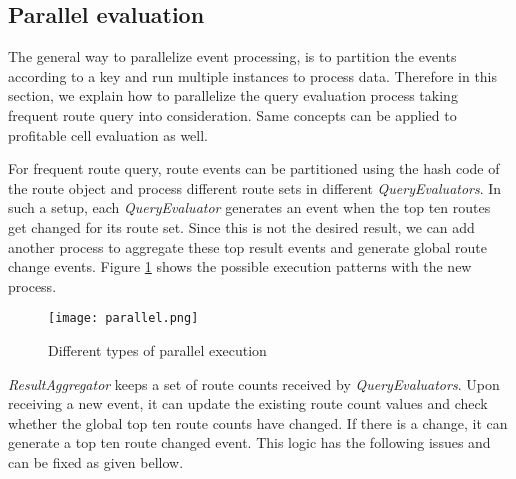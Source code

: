 \subsection{Parallel evaluation}
The general way to parallelize event processing, is to partition the events according to a key and run multiple instances to process data. Therefore in this section, we explain how to parallelize the query evaluation process taking frequent route query into consideration. Same concepts can be applied to profitable cell evaluation as well.

For frequent route query, route events can be partitioned using the hash code of the route object and process different route sets in different \textit{QueryEvaluators}. In such a setup, each \textit{QueryEvaluator} generates an event when the top ten routes get changed for its route set. Since this is not the desired result, we can add another process to aggregate these top result events and generate global route change events. Figure \ref{parallel} shows the possible execution patterns with the new process.

\begin{figure}[!t]
        \centering
        \texttt{[image: parallel.png]}
        \caption{Different types of parallel execution}
        \label{parallel}
\end{figure}

\textit{ResultAggregator} keeps a set of route counts received by \textit{QueryEvaluators}. Upon receiving a new event, it can update the existing route count values and check whether the global top ten route counts have changed. If there is a change, it can generate a top ten route changed event. This logic has the following issues and can be fixed as given bellow.

